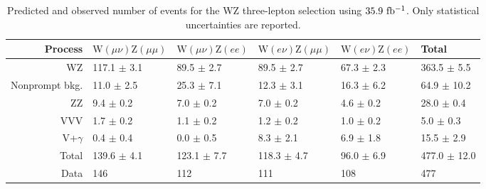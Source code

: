 \setlength{\tabcolsep}{12pt}
\begin{table}[!b]
  \caption{Predicted and observed number of events for the WZ three-lepton selection using $35.9~\mathrm{fb^{-1}}$.
  Only statistical uncertainties are reported.
  \label{tab:wz3lyields}}
  \begin{center}
{\scriptsize
  \begin{tabular}{rlllll}
\hline 
Process & $\mathrm{W}(\mu\nu)\mathrm{Z}(\mu\mu)$ & $\mathrm{W}(\mu\nu)\mathrm{Z}(ee)$ & $\mathrm{W}(e\nu)\mathrm{Z}(\mu\mu)$ & $\mathrm{W}(e\nu)\mathrm{Z}(ee)$ & Total \\
\hline
WZ                    &  117.1 $\pm$ 3.1 &   89.5 $\pm$  2.7 &   89.5 $\pm$ 2.7 &  67.3 $\pm$ 2.3 & 363.5 $\pm$   5.5 \\ 
Nonprompt bkg.        &   11.0 $\pm$ 2.5 &   25.3 $\pm$  7.1 &   12.3 $\pm$ 3.1 &  16.3 $\pm$ 6.2 &  64.9 $\pm$  10.2 \\ 
ZZ                    &    9.4 $\pm$ 0.2 &    7.0 $\pm$  0.2 &    7.0 $\pm$ 0.2 &   4.6 $\pm$ 0.2 &  28.0 $\pm$   0.4 \\ 
VVV                   &    1.7 $\pm$ 0.2 &    1.1 $\pm$  0.2 &    1.2 $\pm$ 0.2 &   1.0 $\pm$ 0.2 &   5.0 $\pm$   0.3 \\ 
V+$\gamma$            &    0.4 $\pm$ 0.4 &    0.0 $\pm$  0.5 &    8.3 $\pm$ 2.1 &   6.9 $\pm$ 1.8 &  15.5 $\pm$   2.9 \\ 
\hline
Total                 &  139.6 $\pm$ 4.1 &  123.1 $\pm$  7.7 &  118.3 $\pm$ 4.7 &  96.0 $\pm$ 6.9 & 477.0 $\pm$  12.0 \\
\hline
Data                  &  146             &  112              &  111             & 108             & 477               \\
\hline
  \end{tabular}
}
  \end{center}
\end{table}
\clearpage

